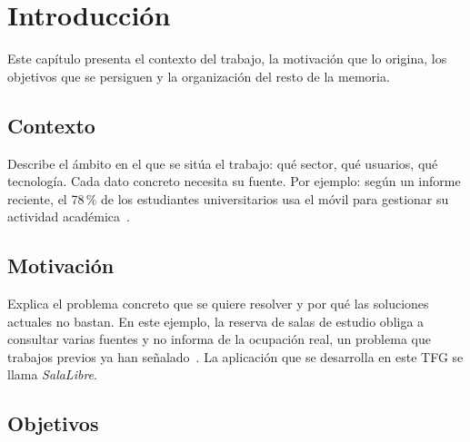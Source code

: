 \chapter{Introducción}
\label{cap:introduccion}

Este capítulo presenta el contexto del trabajo, la motivación que lo origina,
los objetivos que se persiguen y la organización del resto de la memoria.

\section{Contexto}
\label{sec:contexto}

Describe el ámbito en el que se sitúa el trabajo: qué sector, qué usuarios, qué
tecnología. Cada dato concreto necesita su fuente. Por ejemplo: según un informe
reciente, el 78\,\% de los estudiantes universitarios usa el móvil para
gestionar su actividad académica~\cite{informe_movil2025}.


\section{Motivación}
\label{sec:motivacion}

Explica el problema concreto que se quiere resolver y por qué las soluciones
actuales no bastan. En este ejemplo, la reserva de salas de estudio obliga a
consultar varias fuentes y no informa de la ocupación real, un problema que
trabajos previos ya han señalado~\cite{garcia2024movil}. La aplicación que se
desarrolla en este \ac{TFG} se llama \emph{SalaLibre}.

\section{Objetivos}
\label{sec:objetivos}

